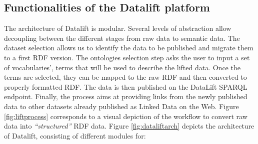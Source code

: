 \begin{figure}[!htp]
\end{figure}


\subsection{Functionalities of the Datalift platform}

The architecture of Datalift is modular. Several levels of abstraction allow decoupling between the different stages from raw data to semantic data. The dataset selection allows us to identify the data to be published and migrate them to a first RDF version. The ontologies selection step asks the user to input a set of vocabularies', terms that will be used to describe the lifted data. Once the terms are selected, they can be mapped to the raw RDF and then converted to properly formatted RDF. The data is then published on the DataLift SPARQL endpoint. Finally, the process aims at providing links from the newly published data to other datasets already published as Linked Data on the Web. Figure \ref{fig:liftprocess} corresponds to a visual depiction of the workflow to convert raw data into \textit{``structured''} RDF data. Figure \ref{fig:dataliftarch} depicts the architecture of Datalift, consisting of different modules for:

